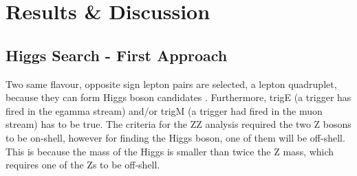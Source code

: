 \documentclass[runningheads,a4paper]{llncs}
\begin{document}
\pagebreak
\section{Results \& Discussion}
\subsection{Higgs Search - First Approach}
Two same flavour, opposite sign lepton pairs are selected, a lepton quadruplet, because they can form Higgs boson candidates \cite{atlas2014fiducial}. Furthermore, trigE (a trigger has fired in the egamma stream) and/or trigM (a trigger had fired in the muon stream) has to be true. The criteria for the ZZ analysis required the two Z bosons to be on-shell, however for finding the Higgs boson, one of them will be off-shell. This is because the mass of the Higgs is smaller than twice the Z mass, which requires one of the Zs to be off-shell.\\
\end{document}
